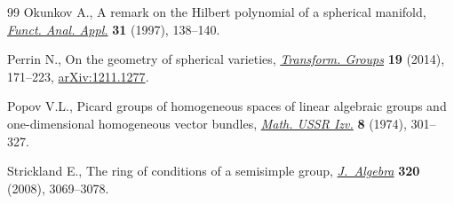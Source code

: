 \documentclass[pdftex]{sigma}
\numberwithin{equation}{section}
\theoremstyle{definition}
\begin{document}
\begin{thebibliography}{99}
Okunkov A., A remark on the {H}ilbert polynomial of a spherical manifold,
 \href{https://doi.org/10.1007/BF02466023}{\textit{Funct. Anal. Appl.}} \textbf{31} (1997), 138--140.

Perrin N., On the geometry of spherical varieties, \href{https://doi.org/10.1007/s00031-014-9254-0}{\textit{Transform. Groups}}
 \textbf{19} (2014), 171--223, \href{https://arxiv.org/abs/1211.1277}{arXiv:1211.1277}.

Popov V.L., Picard groups of homogeneous spaces of linear algebraic groups and
 one-dimensional homogeneous vector bundles, \href{https://doi.org/10.1070/IM1974v008n02ABEH002107}{\textit{Math. USSR Izv.}}
 \textbf{8} (1974), 301--327.

Strickland E., The ring of conditions of a semisimple group,
 \href{https://doi.org/10.1016/j.jalgebra.2008.07.003}{\textit{J.~Algebra}} \textbf{320} (2008), 3069--3078.

\end{thebibliography}\LastPageEnding
\end{document}
